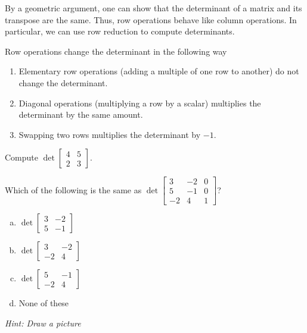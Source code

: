 
\begin{applicationActivities}{2}{26}

\begin{fact}
By a geometric argument, one can show that the determinant of a matrix and its transpose are the same.    Thus, row operations behave like column operations.  In particular, we can use row reduction to compute determinants.
\end{fact}

\begin{fact}
Row operations change the determinant in the following way
\begin{enumerate}
\item Elementary row operations (adding a multiple of one row to another) do not change the determinant.
\item Diagonal operations (multiplying a row by a scalar) multiplies the determinant by the same amount.
\item Swapping two rows multiplies the determinant by $-1$.
\end{enumerate}
\end{fact}

\begin{activity}{10}
  Compute $\det \begin{bmatrix} 4 & 5 \\ 2 & 3 \end{bmatrix}$.
\end{activity}


\begin{activity}{10}
  Which of the following is the same as $\det \begin{bmatrix} 3 & -2 & 0 \\  5 & -1 & 0 \\  -2 & 4 & 1\end{bmatrix}$?
\begin{enumerate}[(a)]
\item $\det \begin{bmatrix} 3 & -2 \\ 5 & -1 \end{bmatrix}$
\item $\det \begin{bmatrix} 3 & -2 \\ -2 & 4 \end{bmatrix}$
\item $\det \begin{bmatrix} 5 & -1 \\ -2 & 4 \end{bmatrix}$
\item None of these
\end{enumerate}
{\em Hint: Draw a picture}
\end{activity}


\end{applicationActivities}
